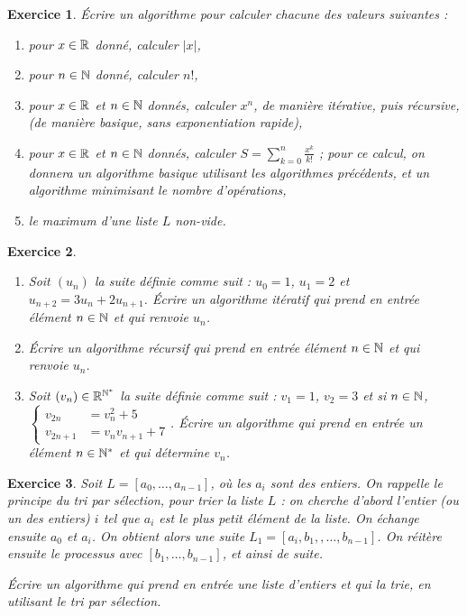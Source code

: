 \documentclass[11pt,a4paper]{article}
\newtheorem{ex}{Exercice}
\begin{document}
\begin{ex}\label{prelim}
Écrire un algorithme pour calculer chacune des valeurs suivantes : 
\begin{enumerate}
\item pour $x\in\mathbb{R}$ donné, calculer $|x|$,
\item pour $n\in\mathbb{N}$ donné, calculer $n!$,
\item pour $x\in\mathbb{R}$ et $n\in\mathbb{N}$ donnés, calculer $x^n$, de manière itérative, puis récursive, (de manière basique, sans exponentiation rapide),
\item pour $x\in\mathbb{R}$ et $n\in\mathbb{N}$ donnés, calculer $S = \sum_{k=0}^n
  \frac{x^k}{k!}$ ; pour ce calcul, on donnera un algorithme basique  utilisant les algorithmes précédents,
  et un algorithme minimisant le nombre d'opérations,
  
\item   le maximum d'une liste $L$ non-vide.
\end{enumerate}
\end{ex}



\begin{ex}\label{exSuite_recurrente}
\begin{enumerate}
\item Soit $(u_n)$ la suite définie comme suit : $u_0=1$, $u_1=2$ et $u_{n+2}=3u_n+2u_{n+1}$. Écrire un algorithme itératif qui prend en entrée élément $n\in \mathbb{N}$ et qui renvoie $u_n$.

\item Écrire un algorithme récursif qui prend en entrée élément $n\in \mathbb{N}$ et qui renvoie $u_n$.

\item Soit $(v_n)\in \mathbb{R}^{\mathbb{N}^*}$ la suite définie comme suit : $v_1=1$, $v_2=3$ et si $n\in \mathbb{N}$,  $\left\{\begin{aligned} v_{2n}&= v_n^2+5 \\
v_{2n+1}&= 
 v_n v_{n+1}+7 \end{aligned}\right.$. Écrire un algorithme qui prend en entrée un élément $n\in \mathbb{N}^*$ et qui  détermine $v_n$. 
\end{enumerate} 
\end{ex}

 

\begin{ex}\label{exTri_selection}
Soit $L=[a_0,\ldots,a_{n-1}]$, où les $a_i$ sont des entiers.  On rappelle le principe du tri par sélection, pour trier la liste $L$ : 
on cherche d'abord l'entier (ou un des entiers) $i$ tel que  $a_i$ est le plus petit élément de la liste. On échange ensuite $a_0$ et $a_i$. On obtient alors une suite $L_1=[a_i,b_1,,\ldots,b_{n-1}]$.  On réitère ensuite le processus avec $[b_1,\ldots,b_{n-1}]$, et ainsi de suite.

Écrire un algorithme qui prend en entrée une liste d'entiers et qui la trie, en utilisant le tri par sélection.
\end{ex}
\end{document}
